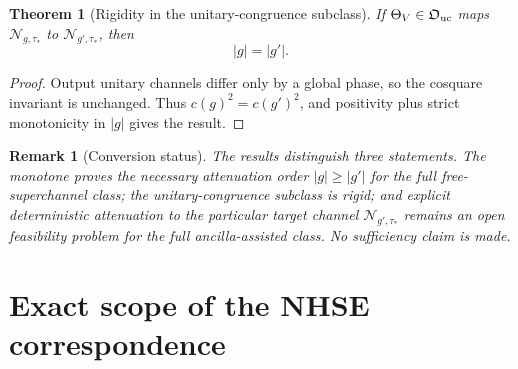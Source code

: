 \documentclass[reprint,amsmath,amssymb,aps,nofootinbib]{revtex4-2}
\newtheorem{theorem}{Theorem}
\newtheorem{remark}{Remark}
\newcommand{\FreeOps}{\mathfrak O}
\begin{document}
\begin{theorem}[Rigidity in the unitary-congruence subclass]
If $\Theta_V\in\FreeOps_{\rm uc}$ maps $\mathcal N_{g,\tau_*}$ to
$\mathcal N_{g',\tau_*}$, then
\begin{equation}
\boxed{|g|=|g'|.}
\end{equation}
\end{theorem}

\begin{proof}
Output unitary channels differ only by a global phase, so the cosquare invariant is unchanged.
Thus $c(g)^2=c(g')^2$, and positivity plus strict monotonicity in $|g|$ gives the result.
\end{proof}

\begin{remark}[Conversion status]
The results distinguish three statements. The monotone proves the necessary attenuation order
$|g|\ge|g'|$ for the full free-superchannel class; the unitary-congruence subclass is rigid; and
explicit deterministic attenuation to the particular target channel $\mathcal N_{g',\tau_*}$ remains
an open feasibility problem for the full ancilla-assisted class. No sufficiency claim is made.
\end{remark}

\section{Exact scope of the NHSE correspondence}
\label{sec:nhse-scope}
\end{document}
